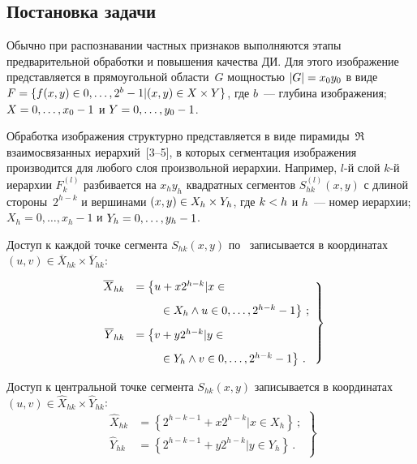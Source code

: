 \begin{multicols}{2}
\section{Постановка задачи}

  Обычно при распознавании частных признаков выполняются этапы 
предварительной обработки и повышения качества ДИ. Для этого изображение 
представляется в прямоугольной области~$G$ мощностью $\vert G\vert 
\hm=x_0y_0$ в виде $F\hm=\{f(x,y)\hm\in 0, \ldots , 2^b-1\vert (x,y)\hm\in X\times Y\}$, где 
$b$~--- глубина изоб\-ра\-же\-ния; $X\hm=0, \ldots , x_0\hm-1$ и $Y\hm=0, \ldots 
, y_0\hm-1$. 
  
  Обработка изображения структурно пред\-став\-ля\-ет\-ся в виде 
пирамиды~$\mathfrak{R}$ взаимосвязанных иерархий~[3--5], в которых 
сегментация изображения производится для любого слоя произвольной 
иерархии. Например, $l$-й слой $k$-й иерархии $F_k^{(l)}$ разбивается на 
$x_h y_h$ квадратных сегментов $S_{hk}^{(l)}(x,y)$ с длиной стороны~$2^{h-
k}$ и вершинами $(x,y)\hm\in X_h\hm\times Y_h$, где $k\hm<h$ и $h$~--- номер иерархии; 
$X_h=0, \ldots , x_h-1$ и $Y_h\hm=0, \ldots , y_h-1$.
  
  Доступ к каждой точке сегмента $S_{hk}(x,y)$ по~\cite{3-g} записывается в 
координатах $(u,v)\in \overline{X}_{hk}\times \overline{Y}_{hk}$:

\noindent
  \begin{equation}
  \left.
  \begin{array}{rl}
  \overline{X}_{hk} &= \left\{ u+x2^{h-k}\vert x\in{}\right.\\[9pt]
  &\hspace*{7mm}\left.{}\in X_h \land u\in 0, \ldots , 2^{h-
k}-1\right\}\,;\\[9pt]
  \overline{Y}_{hk} &= \left\{ v+y2^{h-k}\vert y\in {}\right.\\[9pt]
  &\hspace*{7mm}\left.{}\in Y_h \land v\in 0, \ldots , 2^{h-
k}-1\right\}\,.
  \end{array}
  \right\}
  \label{e1-g}
  \end{equation}
  
  Доступ к центральной точке сегмента $S_{hk}(x,y)$ записывается в 
координатах $(u,v)\in \hat{X}_{hk}\times \hat{Y}_{hk}$:
  \begin{equation}
  \left.
  \begin{array}{rl}
  \hat{X}_{hk} &=\left\{ 2^{h-k-1}+x 2^{h-k}\vert x\in X_h\right\}\,;\\[9pt]
  \hat{Y}_{hk} &=\left\{ 2^{h-k-1}+y 2^{h-k}\vert y\in Y_h\right\}\,.
  \end{array}
  \right\}
  \label{e2-g}
  \end{equation}
  

\end{multicols}
